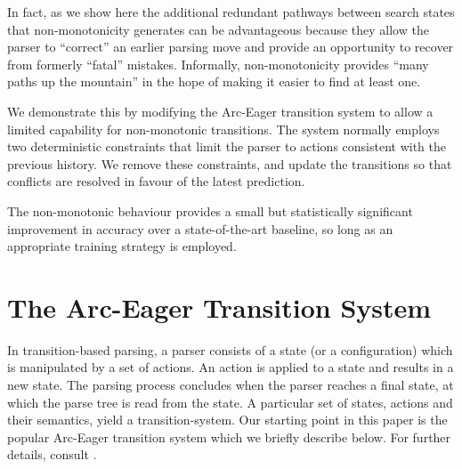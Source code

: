 \documentclass[11pt,letterpaper]{article}
\begin{document}
In fact, as we show here  the
additional redundant pathways between search states that non-monotonicity
generates can be advantageous because they allow the parser to ``correct'' an earlier
parsing move and provide an opportunity to recover from formerly ``fatal'' mistakes.
Informally, non-monotonicity provides ``many paths up the mountain'' in the hope
of making it easier to find at least one.

We demonstrate this by modifying the Arc-Eager transition system to allow a limited
capability for non-monotonic transitions. The system normally employs two
deterministic constraints that limit the parser to actions consistent with the
previous history. We remove these constraints, and update the transitions
so that conflicts are resolved in favour of the latest prediction.

The non-monotonic behaviour provides a small but statistically significant improvement in
accuracy over a state-of-the-art baseline,
so long as an appropriate training strategy is employed. 



\section{The Arc-Eager Transition System}
In transition-based parsing, a parser consists of a state (or a
configuration) which is manipulated by a set of actions.  An action is
applied to a state and results in a new state.  The parsing process
concludes when the parser reaches a final state, at which the
parse tree is read from the state.  A particular set of states,
actions and their semantics, yield a transition-system. Our starting
point in this paper is the popular Arc-Eager transition system which
we briefly describe below.  For further details, consult
\citep{nivre:04,nivre:cl}.
\end{document}
